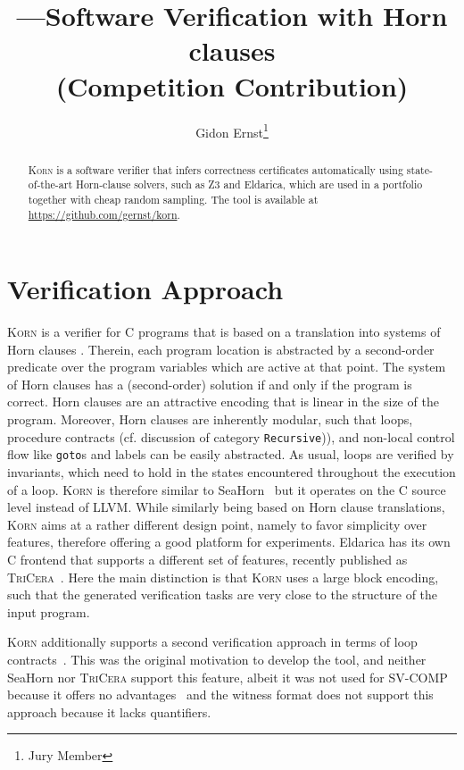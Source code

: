 \documentclass{llncs}
\author{Gidon Ernst\thanks{Jury Member}}
\title{\Korn---Software Verification with Horn clauses \\ (Competition Contribution)}
\institute{LMU Munich \\ \mailto{gidon.ernst@lmu.de}}
\newcommand{\Korn}{\textsc{Korn}\xspace}
\begin{document}
\maketitle

\begin{abstract}
    \Korn is a software verifier that infers correctness certificates automatically using state-of-the-art Horn-clause solvers, such as Z3 and Eldarica,
    which are used in a portfolio together with cheap random sampling.
    The tool is available at \url{https://github.com/gernst/korn}.

\end{abstract}

\section{Verification Approach}
\label{sec:approach}

\Korn is a verifier for C programs that is based on a translation into systems of Horn clauses
\cite{bjorner2015horn,gurfinkel2019science}.
Therein, each program location is abstracted by a second-order predicate
over the program variables which are active at that point.
The system of Horn clauses has a (second-order) solution if and only if the program is correct.
Horn clauses are an attractive encoding that is linear in the size of the program.
Moreover, Horn clauses are inherently modular,
such that loops, procedure contracts (cf. discussion of category \texttt{Recursive})), and non-local control flow like \texttt{goto}s and labels can be easily abstracted.
As usual, loops are verified by invariants, which need to hold in the states
encountered throughout the execution of a loop.
\Korn is therefore similar to SeaHorn~\cite{gurfinkel2015seahorn} but it operates on the C source level instead of LLVM.
While similarly being based on Horn clause translations,
\Korn aims at a rather different design point, namely to favor simplicity over features, therefore offering a good platform for experiments.
Eldarica has its own C frontend that supports a different set of features,
recently published as \textsc{TriCera}~\cite{esen2022tricera}.
Here the main distinction is that \Korn uses a large block encoding,
such that the generated verification tasks are very close to the structure of the input program.

\Korn additionally supports a second verification approach in terms of loop contracts~\cite{hehner1999refinement,tuerk2010local,hehner2005specified,ernst:vmcai2022}.
This was the original motivation to develop the tool, and neither
SeaHorn nor \textsc{TriCera} support this feature,
albeit it was not used for SV-COMP because
it offers no advantages~\cite{ernst:arxiv2020:summaries}
and the witness format does not support this approach because it lacks quantifiers.
\end{document}
